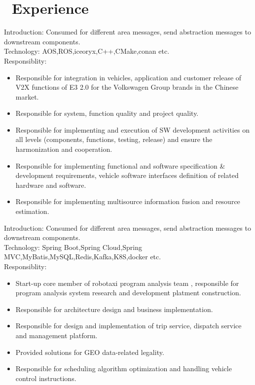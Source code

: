 \documentclass{resume}
\begin{document}
\section{\faUsers\ Experience}
Introduction: Consumed for different area messages, send abstraction messages to downstream components.\\
Technology: AOS,ROS,iceoryx,C++,CMake,conan etc.\\
Responsiblity:
\begin{itemize}
  \item Responsible for integration in vehicles, application and customer release of V2X functions of E3 2.0 for the Volkswagen Group brands in the Chinese market.
  \item Responsible for system, function quality and project quality.
  \item Responsible for implementing and execution of SW development activities on all levels (components, functions, testing, release) and ensure the harmonization and cooperation.
  \item Responsible for implementing functional and software specification & development requirements, vehicle software interfaces definition of related hardware and software.
  \item Responsible for implementing multisource information fusion and resource estimation.
\end{itemize}
Introduction: Consumed for different area messages, send abstraction messages to downstream components.\\
Technology: Spring Boot,Spring Cloud,Spring MVC,MyBatis,MySQL,Redis,Kafka,K8S,docker etc.\\
Responsiblity:
\begin{itemize}
\item Start-up core member of robotaxi program analysis team , responsible for program analysis system research and development platment construction.
\item Responsible for architecture design and business implementation.
\item Responsible for design and implementation of trip service, dispatch service and management platform.
\item Provided solutions for GEO data-related legality. 
\item Responsible for scheduling algorithm optimization and handling vehicle control instructions.
\end{itemize}
\end{document}

